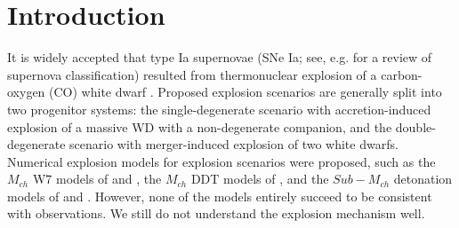 \documentclass[twocolumn]{aastex631}
\begin{document}

\section{Introduction} \label{sec:intro}

It is widely accepted that type Ia supernovae (SNe Ia; see, e.g. \citealt{1997ARA&A..35..309F} for a review of supernova classification) resulted from thermonuclear explosion of a carbon-oxygen (CO) white dwarf \citep{1997Sci...276.1378N,2000ARA&A..38..191H,2014ARA&A..52..107M}. Proposed explosion scenarios are generally split into two progenitor systems: the single-degenerate scenario \citep{1973ApJ...186.1007W} with accretion-induced explosion of a massive WD with a non-degenerate companion, and the double-degenerate \citep{1984ApJS...54..335I,1984ApJ...277..355W} scenario with merger-induced explosion of two white dwarfs. Numerical explosion models for explosion scenarios were proposed, such as the $M_{ch}$ W7 models of \citet{1997NuPhA.621..467N} and \citet{1999ApJS..125..439I}, the $M_{ch}$ DDT models of \citet{2013MNRAS.429.1156S}, and the $Sub-M_{ch}$ detonation models of \citet{2010ApJ...714L..52S} and \citet{2018ApJ...854...52S}. However, none of the models entirely succeed to be consistent with observations. We still do not understand the explosion mechanism well.
\end{document}
